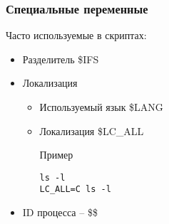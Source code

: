 \begin{frame}[fragile]
	\frametitle{Специальные переменные}

	Часто используемые в скриптах:

	\begin{itemize}
		\item Разделитель \$IFS
		\item Локализация
			\begin{itemize}
				\item Используемый язык \$LANG
				\item Локализация \$LC\_ALL
					\begin{block}{Пример}
						\begin{lstlisting}
ls -l 
LC_ALL=C ls -l
						\end{lstlisting}
					\end{block}
			\end{itemize}
		\item ID процесса -- \$\$
	\end{itemize}

\end{frame}




